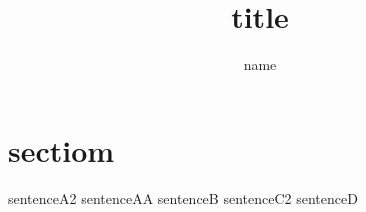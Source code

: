 \documentclass{jarticle}
\title{title}
\author{name}
\begin{document}
\maketitle
\section{sectiom}
sentenceA2
sentenceAA
sentenceB
sentenceC2
sentenceD
\end{document}
